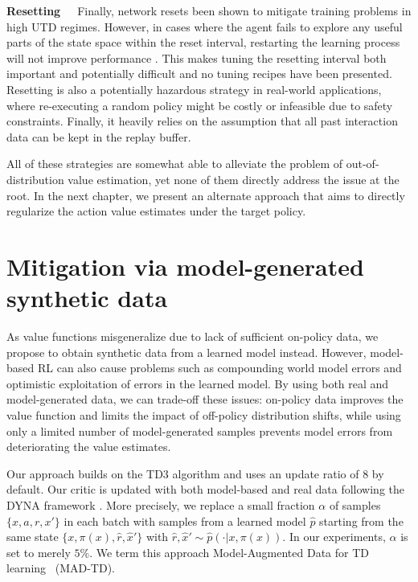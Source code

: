 \textbf{Resetting}~~~Finally, network resets been shown to mitigate training problems \parencite{nikishin2022primacy,doro2023barrier,schwarzer2023bigger,nauman2024bigger} in high UTD regimes.
However, in cases where the agent fails to explore any useful parts of the state space within the reset interval, restarting the learning process will not improve performance \parencite{hussing2024dissecting}.
This makes tuning the resetting interval both important and potentially difficult and no tuning recipes have been presented.
Resetting is also a potentially hazardous strategy in real-world applications, where re-executing a random policy might be costly or infeasible due to safety constraints.
Finally, it heavily relies on the assumption that all past interaction data can be kept in the replay buffer.

All of these strategies are somewhat able to alleviate the problem of out-of-distribution value estimation, yet none of them directly address the issue at the root.
In the next chapter, we present an alternate approach that aims to directly regularize the action value estimates under the target policy.

\section{Mitigation via model-generated synthetic data}

As value functions misgeneralize due to lack of sufficient on-policy data, we propose to obtain synthetic data from a learned model instead.
However, model-based RL can also cause problems such as compounding world model errors and optimistic exploitation of errors in the learned model. 
By using both real and model-generated data, we can trade-off these issues: on-policy data improves the value function and limits the impact of off-policy distribution shifts, while using only a limited number of model-generated samples prevents model errors from deteriorating the value estimates. 

Our approach builds on the TD3 algorithm \parencite{fujimoto2018addressing} and uses an update ratio of 8 by default. 
Our critic is updated with both model-based and real data following the DYNA framework \parencite{dyna}.
More precisely, we replace a small fraction $\alpha$ of samples $\{x,a,r,x'\}$ in each batch with samples from a learned model $\hat{p}$ starting from the same state $\{x, \pi(x), \hat{r} ,\hat{x}'\}$ with $\hat{r}, \hat{x}' \sim \hat{p}(\cdot|x, \pi(x))$. In our experiments, $\alpha$ is set to merely $5\%$.
We term this approach Model-Augmented Data for TD learning ~(MAD-TD).%

